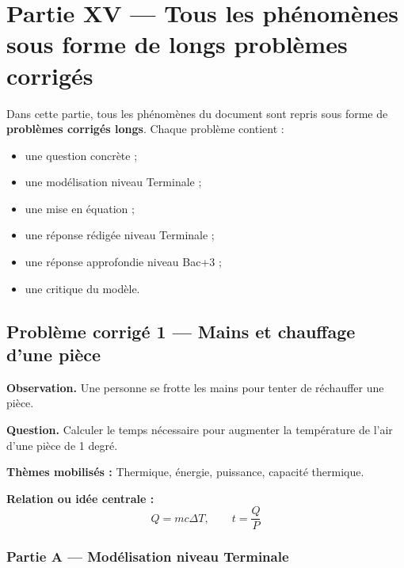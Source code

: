 \documentclass[11pt,a4paper]{article}
\begin{document}
\section{Partie XV — Tous les phénomènes sous forme de longs problèmes corrigés}

\begin{attentionbox}
Dans cette partie, tous les phénomènes du document sont repris sous forme de \textbf{problèmes corrigés longs}. Chaque problème contient :
\begin{itemize}
  \item une question concrète ;
  \item une modélisation niveau Terminale ;
  \item une mise en équation ;
  \item une réponse rédigée niveau Terminale ;
  \item une réponse approfondie niveau Bac+3 ;
  \item une critique du modèle.
\end{itemize}
\end{attentionbox}

\subsection{Problème corrigé 1 — Mains et chauffage d'une pièce}

\begin{exercicebox}
\textbf{Observation.} Une personne se frotte les mains pour tenter de réchauffer une pièce.

\medskip
\textbf{Question.} Calculer le temps nécessaire pour augmenter la température de l'air d'une pièce de 1 degré.

\medskip
\textbf{Thèmes mobilisés :} Thermique, énergie, puissance, capacité thermique.

\medskip
\textbf{Relation ou idée centrale :}
\[
Q=mc\Delta T,\qquad t=\frac{Q}{P}
\]
\end{exercicebox}

\subsubsection*{Partie A — Modélisation niveau Terminale}
\end{document}
